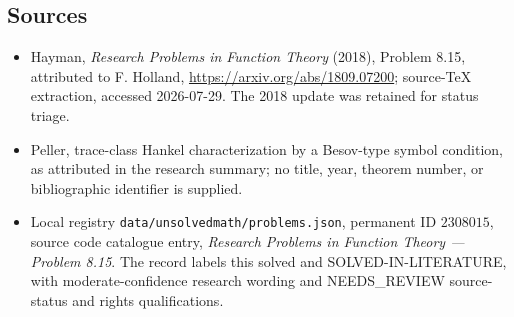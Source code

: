 \documentclass[11pt]{article}
\begin{document}
\subsection{Sources}
\begin{itemize}
\item Hayman, \emph{Research Problems in Function Theory} (2018), Problem 8.15, attributed to F. Holland, \url{https://arxiv.org/abs/1809.07200}; source-TeX extraction, accessed 2026-07-29. The 2018 update was retained for status triage.
\item Peller, trace-class Hankel characterization by a Besov-type symbol condition, as attributed in the research summary; no title, year, theorem number, or bibliographic identifier is supplied.
\item Local registry \texttt{data/unsolvedmath/problems.json}, permanent ID $2308015$, source code catalogue entry, \emph{Research Problems in Function Theory --- Problem 8.15}. The record labels this solved and SOLVED-IN-LITERATURE, with moderate-confidence research wording and NEEDS\_REVIEW source-status and rights qualifications.
\end{itemize}
\end{document}

